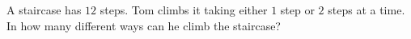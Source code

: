 A staircase has $12$ steps. Tom climbs it taking either $1$ step or $2$ steps at a time. In how many different ways can he climb the staircase?
